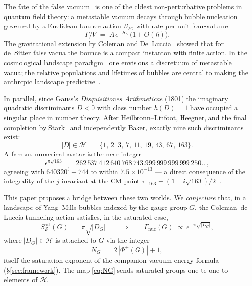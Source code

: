 \documentclass[11pt,a4paper]{article}
\theoremstyle{plain}
\theoremstyle{definition}
\newcommand{\Phip}{\Phi^{+}}
\newcommand{\sat}{\mathrm{sat}}
\newcommand{\nuc}{\mathrm{nuc}}
\begin{document}
The fate of the false vacuum~\cite{Coleman1977} is one of the oldest non-perturbative problems in quantum field theory: a metastable vacuum decays through bubble nucleation governed by a Euclidean bounce action $S_E$, with rate per unit four-volume
\begin{equation}\label{eq:rate}
\Gamma/V \;=\; A\,e^{-S_E}\,\bigl(1+O(\hbar)\bigr).
\end{equation}
The gravitational extension by Coleman and De~Luccia~\cite{ColemanDeLuccia1980} showed that for de~Sitter false vacua the bounce is a compact instanton with finite action. In the cosmological landscape paradigm~\cite{Susskind2003,BoussoPolchinski2000,Douglas2003} one envisions a discretuum of metastable vacua; the relative populations and lifetimes of bubbles are central to making the anthropic landscape predictive~\cite{Tegmark1997,Carter2006}.

In parallel, since Gauss's \emph{Disquisitiones Arithmeticae} (1801) the imaginary quadratic discriminants $D<0$ with class number $h(D)=1$ have occupied a singular place in number theory. After Heilbronn--Linfoot, Heegner, and the final completion by Stark~\cite{Stark1967} and independently Baker, exactly nine such discriminants exist:
\[
|D|\in\mathcal{H}\;=\;\{1,\,2,\,3,\,7,\,11,\,19,\,43,\,67,\,163\}.
\]
A famous numerical avatar is the near-integer
\begin{equation}\label{eq:nearinteger}
e^{\pi\sqrt{163}} \;=\; 262\,537\,412\,640\,768\,743.999\,999\,999\,999\,250\ldots,
\end{equation}
agreeing with $640320^3+744$ to within $7.5\times 10^{-13}$ --- a direct consequence of the integrality of the $j$-invariant at the CM point $\tau_{-163}=(1+i\sqrt{163})/2$~\cite{GrossZagier1985,Cox2013}.

\medskip

This paper proposes a bridge between these two worlds. We \emph{conjecture} that, in a landscape of Yang--Mills bubbles indexed by the gauge group $G$, the Coleman--de Luccia tunneling action satisfies, in the saturated case,
\begin{equation}\label{eq:main}
S_E^{\sat}(G) \;=\; \pi\sqrt{|D_G|} \qquad\Longrightarrow\qquad \Gamma_{\nuc}(G)\;\propto\;e^{-\pi\sqrt{|D_G|}},
\end{equation}
where $|D_G|\in\mathcal{H}$ is attached to $G$ via the integer
\begin{equation}\label{eq:NG}
N_G \;=\; 2\,|\Phip(G)|+1,
\end{equation}
itself the saturation exponent of the companion vacuum-energy formula (\S\ref{sec:framework}). The map \eqref{eq:NG} sends saturated groups one-to-one to elements of $\mathcal{H}$.
\end{document}
